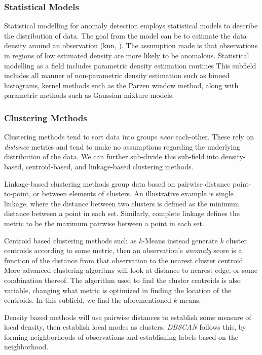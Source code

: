 \subsubsection{Statistical Models}
Statistical modelling for anomaly detection employs statistical models to describe the distribution of
  data.  The goal from the model can be to estimate the data density around an observation (knn, )\findcite.
  The assumption made is that observations in regions of low estimated density are more likely to be
  anomalous.  Statistical modelling as a field includes parametric density estimation routines This
  subfield includes all manner of non-parametric density estimation such as binned histograms, kernel
  methods such as the Parzen window method, along with parametric methods such as Gaussian mixture models.

\subsubsection{Clustering Methods}
Clustering methods tend to sort data into groups \emph{near} each-other.  These rely on \emph{distance}
  metrics and tend to make no assumptions regarding the underlying distribution of the data.  We can
  further sub-divide this sub-field into density-based, centroid-based, and linkage-based clustering
  methods.

Linkage-based clustering methods group data based on pairwise distance point-to-point, or between
  elements of clusters.  An illustrative example is single linkage, where the distance between two
  clusters is defined as the minimum distance between a point in each set.   Similarly, complete
  linkage defines the metric to be the maximum pairwise between a point in each set. \findcite

Centroid based clustering methods such as $k$-Means instead generate $k$ cluster centroids according
  to some metric, then an observation's \emph{anomaly} score is a function of the distance from that
  observation to the nearest cluster centroid.  More advanced clustering algoritms will look at
  distance to nearest edge, or some combination thereof.  The algorithm used to find the cluster
  centroids is also variable, changing what metric is optimized in finding the location of the
  centroids.  In this subfield, we find the aforementioned $k$-means.

Density based methods will use pairwise distances to establish some measure of local density, then
  establish local modes as clusters.  \emph{DBSCAN} \citep{ester1996} follows this, by forming
  neighborhoods of observations and establishing labels based on the neighborhood.

